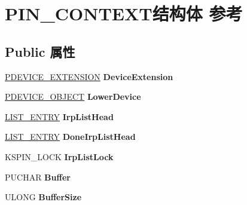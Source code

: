 \hypertarget{struct_p_i_n___c_o_n_t_e_x_t}{}\section{P\+I\+N\+\_\+\+C\+O\+N\+T\+E\+X\+T结构体 参考}
\label{struct_p_i_n___c_o_n_t_e_x_t}
\subsection*{Public 属性}
\begin{DoxyCompactItemize}
\item 
\mbox{\label{struct_p_i_n___c_o_n_t_e_x_t_ac4fab63305053e7f32696303c3871e45}} 
\hyperlink{struct___b_e_e_p___d_e_v_i_c_e___e_x_t_e_n_s_i_o_n}{P\+D\+E\+V\+I\+C\+E\+\_\+\+E\+X\+T\+E\+N\+S\+I\+ON} {\bfseries Device\+Extension}
\item 
\mbox{\label{struct_p_i_n___c_o_n_t_e_x_t_adeda6869a0a9066ed37cd1c5900325fb}} 
\hyperlink{struct___d_e_v_i_c_e___o_b_j_e_c_t}{P\+D\+E\+V\+I\+C\+E\+\_\+\+O\+B\+J\+E\+CT} {\bfseries Lower\+Device}
\item 
\mbox{\label{struct_p_i_n___c_o_n_t_e_x_t_a536e8673fd13574c561bb41b6aab36cd}} 
\hyperlink{struct___l_i_s_t___e_n_t_r_y}{L\+I\+S\+T\+\_\+\+E\+N\+T\+RY} {\bfseries Irp\+List\+Head}
\item 
\mbox{\label{struct_p_i_n___c_o_n_t_e_x_t_ae4bf1d044f17145c96795d9b55e970d6}} 
\hyperlink{struct___l_i_s_t___e_n_t_r_y}{L\+I\+S\+T\+\_\+\+E\+N\+T\+RY} {\bfseries Done\+Irp\+List\+Head}
\item 
\mbox{\label{struct_p_i_n___c_o_n_t_e_x_t_ad30df1ac7829e84713a072cff8835a7f}} 
K\+S\+P\+I\+N\+\_\+\+L\+O\+CK {\bfseries Irp\+List\+Lock}
\item 
\mbox{\label{struct_p_i_n___c_o_n_t_e_x_t_a68a08c215bd1718405aecfcd8cd9400d}} 
P\+U\+C\+H\+AR {\bfseries Buffer}
\item 
\mbox{\label{struct_p_i_n___c_o_n_t_e_x_t_a940389d989616433ac9d44779d19fc87}} 
U\+L\+O\+NG {\bfseries Buffer\+Size}

\end{DoxyCompactItemize}
